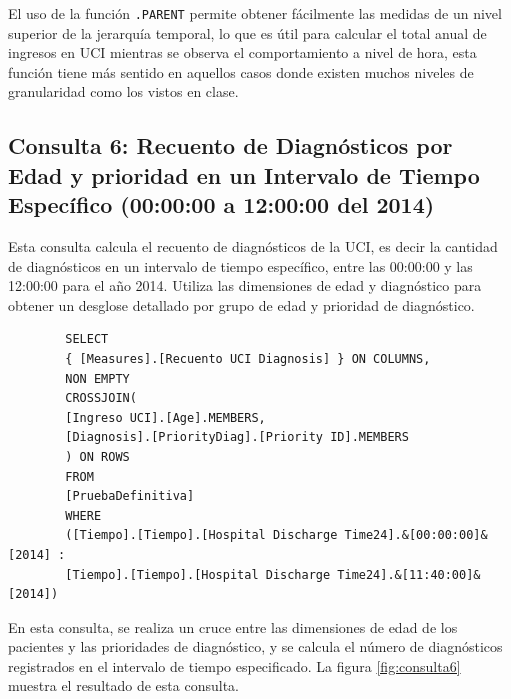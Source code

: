 \documentclass[12pt, a4paper, twoside]{article}
\begin{document}
	El uso de la función \texttt{.PARENT} permite obtener fácilmente las medidas de un nivel superior de la jerarquía temporal, lo que es útil para calcular el total anual de ingresos en UCI mientras se observa el comportamiento a nivel de hora, esta función tiene más sentido en aquellos casos donde existen muchos niveles de granularidad como los vistos en clase.
	
	
	\subsection{Consulta 6: Recuento de Diagnósticos por Edad y prioridad en un Intervalo de Tiempo Específico (00:00:00 a 12:00:00 del 2014)}
	
	Esta consulta calcula el recuento de diagnósticos de la UCI, es decir la cantidad de diagnósticos en un intervalo de tiempo específico, entre las 00:00:00 y las 12:00:00 para el año 2014. Utiliza las dimensiones de edad y diagnóstico para obtener un desglose detallado por grupo de edad y prioridad de diagnóstico.
	
	\begin{verbatim}
		SELECT 
		{ [Measures].[Recuento UCI Diagnosis] } ON COLUMNS,
		NON EMPTY 
		CROSSJOIN(
		[Ingreso UCI].[Age].MEMBERS,
		[Diagnosis].[PriorityDiag].[Priority ID].MEMBERS
		) ON ROWS
		FROM 
		[PruebaDefinitiva]
		WHERE
		([Tiempo].[Tiempo].[Hospital Discharge Time24].&[00:00:00]&[2014] : 
		[Tiempo].[Tiempo].[Hospital Discharge Time24].&[11:40:00]&[2014])
	\end{verbatim}
	
	En esta consulta, se realiza un cruce entre las dimensiones de edad de los pacientes y las prioridades de diagnóstico, y se calcula el número de diagnósticos registrados en el intervalo de tiempo especificado. La figura \ref{fig:consulta6} muestra el resultado de esta consulta.
	
\end{document}
